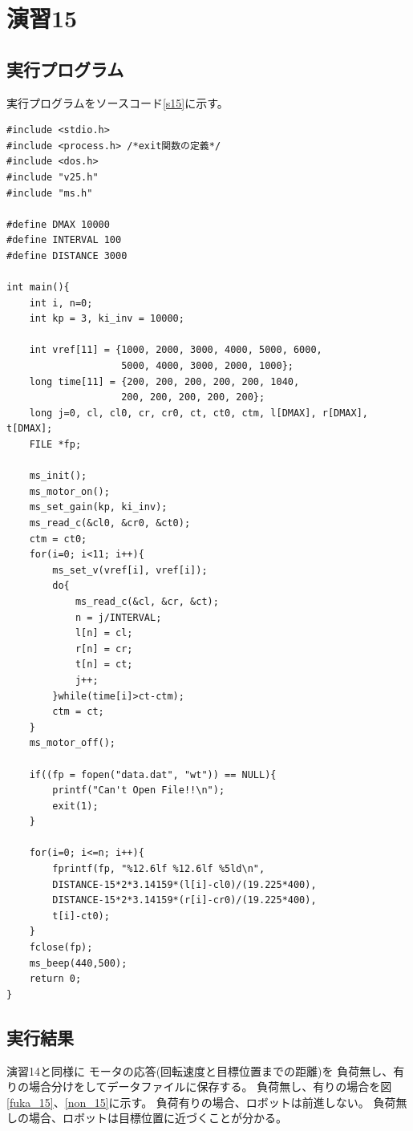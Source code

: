 \section{演習15}
\subsection{実行プログラム}
実行プログラムをソースコード\ref{s15}に示す。

\begin{lstlisting}[caption=演習15のプログラム,label=s15]
#include <stdio.h>
#include <process.h> /*exit関数の定義*/
#include <dos.h>
#include "v25.h"
#include "ms.h"
  
#define DMAX 10000
#define INTERVAL 100
#define DISTANCE 3000
  
int main(){
    int i, n=0;
    int kp = 3, ki_inv = 10000;
  
    int vref[11] = {1000, 2000, 3000, 4000, 5000, 6000,
                    5000, 4000, 3000, 2000, 1000};
    long time[11] = {200, 200, 200, 200, 200, 1040,
                    200, 200, 200, 200, 200};
    long j=0, cl, cl0, cr, cr0, ct, ct0, ctm, l[DMAX], r[DMAX], t[DMAX];
    FILE *fp;
  
    ms_init();
    ms_motor_on();
    ms_set_gain(kp, ki_inv);
    ms_read_c(&cl0, &cr0, &ct0);
    ctm = ct0;
    for(i=0; i<11; i++){
        ms_set_v(vref[i], vref[i]);
        do{
            ms_read_c(&cl, &cr, &ct);
            n = j/INTERVAL;
            l[n] = cl;
            r[n] = cr;
            t[n] = ct;
            j++;
        }while(time[i]>ct-ctm);
        ctm = ct;
    }
    ms_motor_off();
 
    if((fp = fopen("data.dat", "wt")) == NULL){
        printf("Can't Open File!!\n");
        exit(1);
    }

    for(i=0; i<=n; i++){
        fprintf(fp, "%12.6lf %12.6lf %5ld\n",
        DISTANCE-15*2*3.14159*(l[i]-cl0)/(19.225*400),
        DISTANCE-15*2*3.14159*(r[i]-cr0)/(19.225*400),
        t[i]-ct0);
    }
    fclose(fp);
    ms_beep(440,500);
    return 0;
}
\end{lstlisting}

\subsection{実行結果}
演習14と同様に
モータの応答(回転速度と目標位置までの距離)を
負荷無し、有りの場合分けをしてデータファイルに保存する。
負荷無し、有りの場合を図\ref{fuka_15}、\ref{non_15}に示す。
負荷有りの場合、ロボットは前進しない。
負荷無しの場合、ロボットは目標位置に近づくことが分かる。

